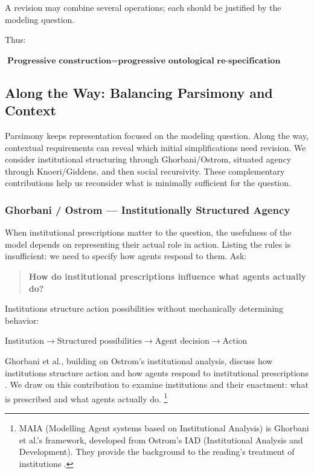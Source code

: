 \documentclass[11pt,a4paper]{article}
\newenvironment{fitdisplay}{\par\medskip\noindent\begin{lrbox}{\displaybox}$\displaystyle}{%
$\end{lrbox}\makebox[\linewidth][c]{\ifdim\wd\displaybox>\linewidth\resizebox{\linewidth}{!}{\usebox{\displaybox}}\else\usebox{\displaybox}\fi}\par\medskip}
\begin{document}
A revision may combine several operations; each should be justified by the modeling question.

Thus:

\begin{fitdisplay}
\boxed{
\textbf{Progressive construction}
=
\textbf{progressive ontological re-specification}
}
\end{fitdisplay}



\subsection{Along the Way: Balancing Parsimony and Context}

Parsimony keeps representation focused on the modeling question. Along the way, contextual requirements can reveal which initial simplifications need revision. We consider institutional structuring through Ghorbani/Ostrom, situated agency through Knoeri/Giddens, and then social recursivity. These complementary contributions help us reconsider what is minimally sufficient for the question.

\subsubsection{Ghorbani / Ostrom --- Institutionally Structured Agency}

When institutional prescriptions matter to the question, the usefulness of the model depends on representing their actual role in action. Listing the rules is insufficient: we need to specify how agents respond to them. Ask:

\begin{quote}
\textbf{How do institutional prescriptions influence what agents actually do?}
\end{quote}

Institutions structure action possibilities without mechanically determining behavior:

\begin{fitdisplay}
\boxed{
\text{Institution}
\rightarrow
\text{Structured possibilities}
\rightarrow
\text{Agent decision}
\rightarrow
\text{Action}
}
\end{fitdisplay}

Ghorbani et al., building on Ostrom's institutional analysis, discuss how institutions structure action and how agents respond to institutional prescriptions \cite{ghorbani}. We draw on this contribution to examine institutions and their enactment: what is prescribed and what agents actually do. \footnote{MAIA (Modelling Agent systems based on Institutional Analysis) is Ghorbani et al.'s framework, developed from Ostrom's IAD (Institutional Analysis and Development). They provide the background to the reading's treatment of institutions \cite{ghorbani}.}
\end{document}
